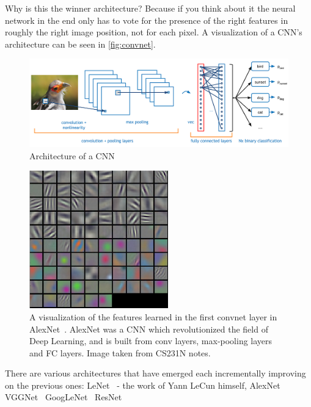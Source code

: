 Why is this the winner architecture? Because if you think about it the neural
network in the end only has to vote for the presence of the right features in roughly
the right image position, not for each pixel. A visualization of a
CNN's architecture can be seen in \autoref{fig:convnet}.

\begin{figure}[!ht]
    \centering
    \includegraphics[width=150mm, keepaspectratio]{figures/convnet.png}
    \caption{Architecture of a CNN}
    \label{fig:convnet}
\end{figure}

\begin{figure}[!ht]
    \centering
    \includegraphics[width=60mm, keepaspectratio]{figures/filters.png}
    \caption{A visualization of the features learned in the first convnet layer in AlexNet~\cite{NIPS2012_4824}. AlexNet was a CNN which revolutionized the field of Deep Learning, and is built from conv layers, max-pooling layers and FC layers. Image taken from CS231N notes.}
    \label{fig:filters}
\end{figure}

There are various architectures that have emerged each incrementally improving on the previous ones:
LeNet~\cite{Lecun98gradient-basedlearning} - the work of Yann LeCun himself,
AlexNet~\cite{NIPS2012_4824}
VGGNet~\cite{DBLP:journals/corr/SimonyanZ14a}
GoogLeNet~\cite{DBLP:journals/corr/SzegedyLJSRAEVR14}
ResNet~\cite{DBLP:journals/corr/HeZRS15}

